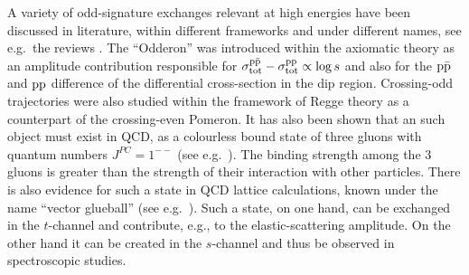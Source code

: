 A variety of odd-signature exchanges relevant at high energies have been discussed in literature, within different frameworks and under different names, see e.g.~the reviews \cite{braun,ewerz}. The ``Odderon'' was introduced within the axiomatic theory \cite{nicolescu-1992,nicolescu-2007} as an amplitude contribution responsible for $\sigma_{\rm tot}^{\rm p\bar p} - \sigma_{\rm tot}^{\rm pp} \propto \log s$ and also for the $\rm p\bar p$ and $\rm pp$ difference of the differential cross-section in the dip region. Crossing-odd trajectories were also studied within the framework of Regge theory as a counterpart of the crossing-even Pomeron. It has also been shown that an such object must exist in QCD, as a colourless bound state of three gluons with quantum numbers $J^{PC} = 1^{--}$ (see e.g.~\cite{bartels-2000}). The binding strength among the 3 gluons is greater than the strength of their interaction with other particles. There is also evidence for such a state in QCD lattice calculations, known under the name ``vector glueball'' (see e.g.~\cite{morningstar-1999}). Such a state, on one hand, can be exchanged in the $t$-channel and contribute, e.g., to the elastic-scattering amplitude. On the other hand it can be created in the $s$-channel and thus be observed in spectroscopic studies.

